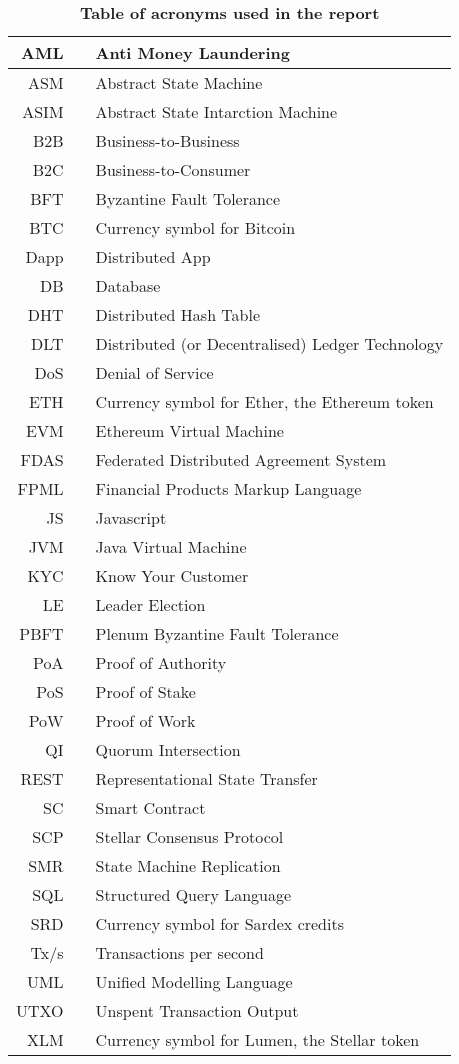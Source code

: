 \begin{table}
\begin{centering}
{\begin{tabular}{| r | c | l |}
\hline
AML		&& Anti Money Laundering\\
\hline
ASM		&& Abstract State Machine \\
\hline
ASIM	&& Abstract State Intarction Machine \\
\hline
B2B		&& Business-to-Business\\
\hline
B2C		&& Business-to-Consumer\\
\hline
BFT		&& Byzantine Fault Tolerance\\
\hline
BTC		&& Currency symbol for Bitcoin\\
\hline
Dapp	&& Distributed App\\
\hline
DB		&& Database\\
\hline
DHT		&& Distributed Hash Table\\
\hline
DLT		&& Distributed (or Decentralised) Ledger Technology\\
\hline
DoS		&& Denial of Service\\
\hline
ETH		&& Currency symbol for Ether, the Ethereum token\\
\hline
EVM		&& Ethereum Virtual Machine\\
\hline
FDAS	&& Federated Distributed Agreement System\\
\hline
FPML	&& Financial Products Markup Language\\
\hline
JS		&& Javascript\\
\hline
JVM		&& Java Virtual Machine\\
\hline
KYC		&& Know Your Customer\\
\hline
LE		&& Leader Election\\
\hline
PBFT	&& Plenum Byzantine Fault Tolerance\\
\hline
PoA		&& Proof of Authority\\
\hline
PoS		&& Proof of Stake \\
\hline
PoW		&& Proof of Work\\
\hline
QI		&& Quorum Intersection\\
\hline
REST 	&& Representational State Transfer\\
\hline
SC		&& Smart Contract\\
\hline
SCP		&& Stellar Consensus Protocol\\
\hline
SMR		&& State Machine Replication\\
\hline
SQL		&& Structured Query Language\\
\hline
SRD		&& Currency symbol for Sardex credits\\
\hline
Tx/s		&& Transactions per second\\
\hline
UML		&& Unified Modelling Language\\
\hline
UTXO	&& Unspent Transaction Output\\
\hline
XLM		&& Currency symbol for Lumen, the Stellar token\\
\hline
\end{tabular}}
\caption{\bf \small Table of acronyms used in the report}
\label{acronyms}
\end{centering}
\end{table}

